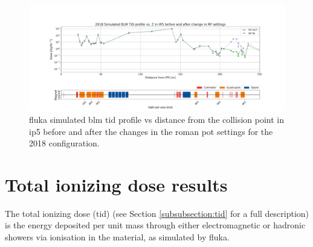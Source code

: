 \documentclass[encoding=utf8,british]{tumphthesis}
\begin{document}
\begin{figure}[H]
    \centering
    \includegraphics[width=1.0\linewidth]{results/TOTEM_RP_impac.png}
    \caption{\acrshort{fluka} simulated \acrshort{blm} \acrshort{tid} profile vs distance from the collision point in \acrshort{ip}5 before and after the changes in the roman pot settings for the 2018 configuration.}
    \label{fig:RP-different-modes}
\end{figure}







\section{Total ionizing dose results}

The total ionizing dose (\acrshort{tid}) (see Section \ref{subsubsection:tid} for a full description) is the energy deposited per unit mass through either electromagnetic or hadronic showers via ionisation in the material, as simulated by \acrshort{fluka}.
\end{document}
